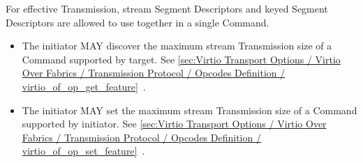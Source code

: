 For effective Transmission, stream Segment Descriptors and keyed Segment
Descriptors are allowed to use together in a single Command.

\begin{itemize}
\item The initiator MAY discover the maximum stream Transmission size of a
Command supported by target. See \ref{sec:Virtio Transport Options / Virtio Over Fabrics / Transmission Protocol / Opcodes Definition / virtio_of_op_get_feature}~.
\item The initiator MAY set the maximum stream Transmission size of a Command
supported by initiator. See \ref{sec:Virtio Transport Options / Virtio Over Fabrics / Transmission Protocol / Opcodes Definition / virtio_of_op_set_feature}~.
\end{itemize}

